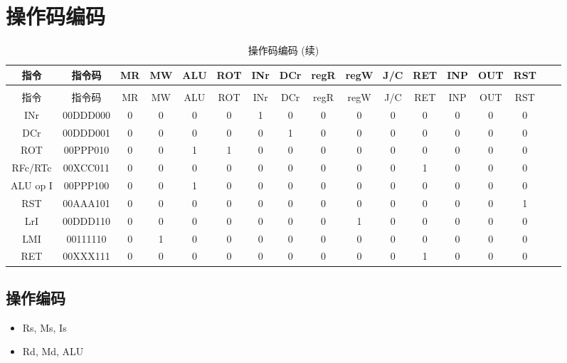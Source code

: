 \documentclass[10pt]{book}
\begin{document}
\section{操作码编码}
\begin{longtable}{|c|c|c|c|c|c|c|c|c|c|c|c|c|c|c|c|c|}
\caption{操作码编码} \label{tb_opcode} \\
\hline
指令 & 指令码 & MR & MW & ALU & ROT & INr & DCr & regR & regW & J/C & RET & INP & OUT & RST \\
\hline
\endfirsthead
\caption{操作码编码 (续)} \\
\hline
指令 & 指令码 & MR & MW & ALU & ROT & INr & DCr & regR & regW & J/C & RET & INP & OUT & RST \\
\hline
\endhead
\hline
\endfoot
INr 			& 00DDD000 & 0 & 0 & 0 & 0 & 1 & 0 & 0 & 0 & 0 & 0 & 0 & 0 & 0 \\
DCr			& 00DDD001 & 0 & 0 & 0 & 0 & 0 & 1 & 0 & 0 & 0 & 0 & 0 & 0 & 0 \\
ROT			& 00PPP010 & 0 & 0 & 1 & 1 & 0 & 0 & 0 & 0 & 0 & 0 & 0 & 0 & 0 \\
RFc/RTc		& 00XCC011 & 0 & 0 & 0 & 0 & 0 & 0 & 0 & 0 & 0 & 1 & 0 & 0 & 0 \\
ALU op I 		& 00PPP100 & 0 & 0 & 1 & 0 & 0 & 0 & 0 & 0 & 0 & 0 & 0 & 0 & 0 \\
RST			& 00AAA101 & 0 & 0 & 0 & 0 & 0 & 0 & 0 & 0 & 0 & 0 & 0 & 0 & 1 \\
LrI			& 00DDD110 & 0 & 0 & 0 & 0 & 0 & 0 & 0 & 1 & 0 & 0 & 0 & 0 & 0 \\
LMI			& 00111110 & 0 & 1 & 0 & 0 & 0 & 0 & 0 & 0 & 0 & 0 & 0 & 0 & 0 \\
RET			& 00XXX111 & 0 & 0 & 0 & 0 & 0 & 0 & 0 & 0 & 0 & 1 & 0 & 0 & 0 \\
\end{longtable}

\subsection{操作编码}
\begin{itemize}
  \item Rs, Ms, Is
  \item Rd, Md, ALU
\end{itemize}
\end{document}
